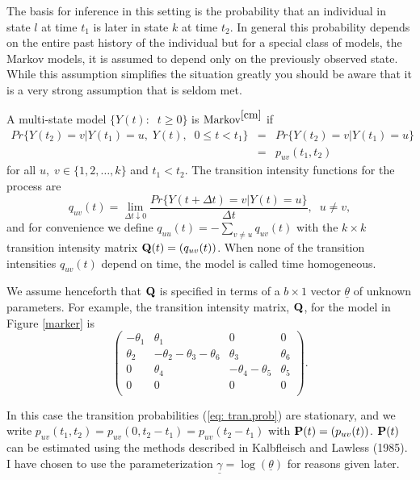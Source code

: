 \documentclass[12pt]{article}
\begin{document}
The basis for inference in this setting is the probability that an individual
in state $l$ at time $t_1$ is later in state $k$ at time $t_2$.
In general this probability depends on the entire past history of the
individual but for a special class of models, the Markov models, it is
assumed to depend only on the previously observed state.
While this assumption simplifies the situation greatly you should be aware
that it is a very strong assumption that is seldom met.

A multi-state model $\{Y(t):  \; \; t \geq 0\}$ is 
$\mbox{Markov}^{\cite{cm}}$ if 
\begin{eqnarray}
 Pr\{Y(t_{2}) = v | Y(t_{1}) = u, \; Y(t), \; \; 0 \leq t < t_{1}\}
& = & Pr\{Y(t_{2}) = v | Y(t_{1}) = u\}  \nonumber \\
& = & p_{uv}(t_{1}, t_{2})
\label{eq: tran.prob}
\end{eqnarray}
for all $u, \; v  \in \{1,2, \ldots, k\}$ and $t_{1} < t_{2}$. 
The transition intensity functions for the process are 
\begin{equation}
 q_{uv}(t) = \lim_{\Delta t \downarrow 0}\frac{Pr\{Y(t+\Delta t)=v
| Y(t)=u\}}{\Delta t}, \; \; u \neq v,   
\label{eq: intsty1}
\end{equation}
and for convenience we define $ q_{uu}(t) = - \sum_{v \neq u} q_{uv}(t)$
with the $k \times k$ transition intensity matrix
${\bf Q}(t) = (q_{uv}(t))$.
When none of the transition intensities $q_{uv}(t)$ depend on time,
the model is called time homogeneous. 

We assume henceforth that 
${\bf Q}$ is specified in terms of a $b \times 1$
vector $\underline{\theta}$ of unknown parameters.
For example, the transition intensity matrix, ${\bf Q}$, for the model
in Figure \ref{marker} is
\begin{equation}
\label{trans}
\left( \begin{array}{cccc}
 - \theta_1 & \theta_1 & 0 & 0 \\
  \theta_2 & -\theta_2-\theta_3-\theta_6 & \theta_3 & \theta_6 \\
 0 & \theta_4 & -\theta_4-\theta_5 & \theta_5 \\
 0 & 0 & 0 & 0 \\
\end{array}
\right).
\end{equation}
 
In this case the transition probabilities (\ref{eq: tran.prob}) are stationary, 
and we write $p_{uv}(t_{1}, t_{2}) = p_{uv}(0, t_{2}-t_{1}) 
= p_{uv}(t_{2}-t_{1})$ with ${\bf P}(t) = (p_{uv}(t))$.  ${\bf P}(t)$
can be estimated using the methods described in 
Kalbfleisch and Lawless (1985).
I have chosen to use the parameterization $\underline{\gamma}=
\log(\underline{\theta})$ for reasons given later.
\end{document}
